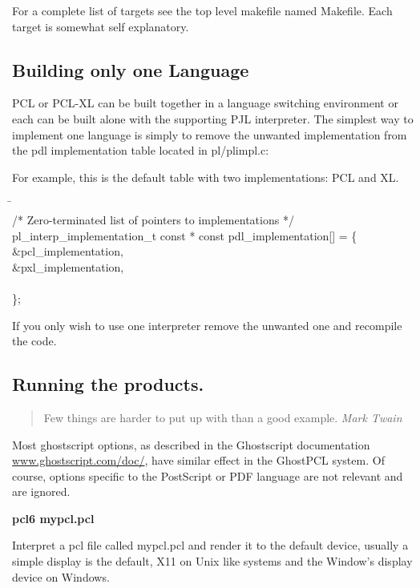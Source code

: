 \documentclass[10pt]{article}
\begin{document}
For a complete list of targets see the top level makefile named Makefile.  Each target is somewhat self explanatory.

\subsection*{Building only one Language}
PCL or PCL-XL can be built together in a language switching
environment or each can be built alone with the supporting PJL
interpreter.  The simplest way to implement one language is simply to
remove the unwanted implementation from the pdl implementation table
located in pl/plimpl.c:

For example, this is the default table with two implementations: PCL and XL. 

\begin{tabbing}
\hspace{.5in}\=\hspace{.5in}\=\\
\> /* Zero-terminated list of pointers to implementations */\\
\> pl\_interp\_implementation\_t const * const pdl\_implementation[] = \{ \\ 
\> \> \&pcl\_implementation, \\ 
\> \> \&pxl\_implementation, \\ 
\>  \\ 
\> \};
\end{tabbing}

If you only wish to use one interpreter remove the unwanted one and
recompile the code.

\subsection*{Running the products.}
\begin{quote}
Few things are harder to put up with than a good example.
\emph{Mark Twain}
\end{quote}


Most ghostscript options, as described in the Ghostscript
documentation \url{www.ghostscript.com/doc/}, have similar effect in
the GhostPCL system.  Of course, options specific to the PostScript or
PDF language are not relevant and are ignored.


\textbf{pcl6 mypcl.pcl}

Interpret a pcl file called mypcl.pcl and render it to the default
device, usually a simple display  is the default, X11 on Unix like systems and the Window's display device on Windows.
\end{document}
